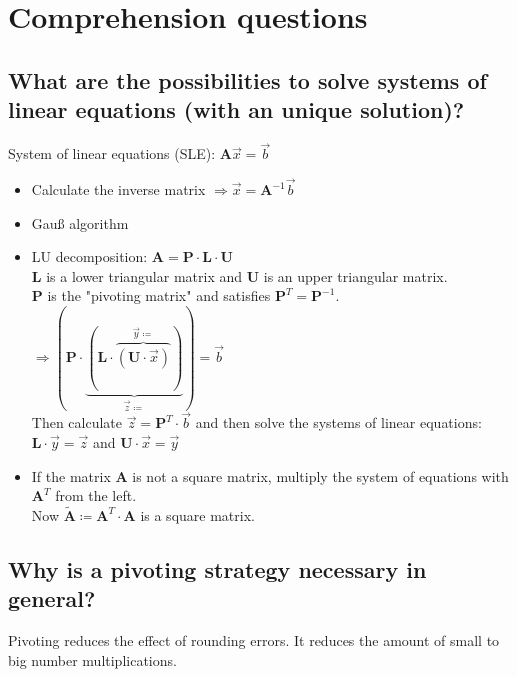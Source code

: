 \setcounter{section}{-1}
\section{Comprehension questions}

\subsection{What are the possibilities to solve systems of linear equations (with an unique solution)?}

System of linear equations (SLE): $\symbf{A} \overrightarrow{x}=\overrightarrow{b}$

\begin{itemize}
    \item Calculate the inverse matrix $\Rightarrow \overrightarrow{x} = \symbf{A}^{-1} \overrightarrow{b}$
    \item Gauß algorithm
    \item LU decomposition: $\symbf{A} = \symbf{P} \cdot \symbf{L} \cdot \symbf{U}$ \\
        $\symbf{L}$ is a lower triangular matrix and $\symbf{U}$ is an upper triangular matrix. \\
        $\symbf{P}$ is the "pivoting matrix" and satisfies $\symbf{P}^T=\symbf{P}^{-1}$. \\
        $\Rightarrow ( \symbf{P} \cdot \underbrace{ ( \symbf{L} \cdot \overbrace{ ( \symbf{U} \cdot \overrightarrow{x} ) }^{\overrightarrow{y}\coloneqq} ) }_{\overrightarrow{z} \coloneqq} ) = \overrightarrow{b}$ \\
        Then calculate $\overrightarrow{z} = \symbf{P}^T \cdot \overrightarrow{b}$ 
        and then solve the systems of linear equations:  \\
        $\symbf{L}\cdot\overrightarrow{y}=\overrightarrow{z}$ and $\symbf{U}\cdot\overrightarrow{x} = \overrightarrow{y}$
    \item If the matrix $\symbf{A}$ is not a square matrix, multiply the system of equations with $\symbf{A}^T$ from the left. \\
        Now $\tilde{\symbf{A}} \coloneqq \symbf{A}^T \cdot \symbf{A}$ is a square matrix.
  \end{itemize}

\subsection{Why is a pivoting strategy necessary in general?}

Pivoting reduces the effect of rounding errors. It reduces the amount of small to big number multiplications.